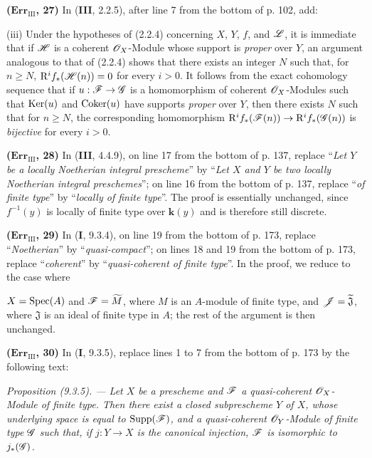 \noindent\textbf{($\mathbf{Err}_{\mathrm{III}}$, 27)} In (\textbf{III}, 2.2.5),
after line 7 from the bottom of p. 102, add:

(iii) Under the hypotheses of (2.2.4) concerning $X$, $Y$, $f$, and $\mathscr{L}$,
it is immediate that if $\mathscr{H}$ is a coherent $\mathscr{O}_X$-Module whose support
is \emph{proper} over $Y$, an argument analogous to that of (2.2.4) shows
that there exists an integer $N$ such that, for $n\geq N$,
$\mathrm{R}^if_*(\mathscr{H}(n))=0$ for every $i>0$. It follows from the exact
cohomology sequence that if $u:\mathscr{F}\to\mathscr{G}$ is a homomorphism of coherent
$\mathscr{O}_X$-Modules such that $\operatorname{Ker}(u)$ and $\operatorname{Coker}(u)$ have supports
\emph{proper} over $Y$, then there exists $N$ such that for $n\geq N$, the
corresponding homomorphism
$\mathrm{R}^if_*(\mathscr{F}(n))\to\mathrm{R}^if_*(\mathscr{G}(n))$ is \emph{bijective} for every
$i>0$.

\noindent\textbf{($\mathbf{Err}_{\mathrm{III}}$, 28)} In (\textbf{III}, 4.4.9), on
line 17 from the bottom of p. 137, replace ``\emph{Let $Y$ be a locally
Noetherian integral prescheme}'' by ``\emph{Let $X$ and $Y$ be two locally
Noetherian integral preschemes}''; on line 16 from the bottom of p. 137,
replace ``\emph{of finite type}'' by ``\emph{locally of finite type}''. The
proof is essentially unchanged, since $f^{-1}(y)$ is locally of finite type
over $\boldsymbol{k}(y)$ and is therefore still discrete.

\noindent\textbf{($\mathbf{Err}_{\mathrm{III}}$, 29)} In (\textbf{I}, 9.3.4), on line
19 from the bottom of p. 173, replace ``\emph{Noetherian}'' by
``\emph{quasi-compact}''; on lines 18 and 19 from the bottom of p. 173,
replace ``\emph{coherent}'' by ``\emph{quasi-coherent of finite type}''. In
the proof, we reduce to the case where

$X=\operatorname{Spec}(A)$ and $\mathscr{F}=\widetilde M$, where $M$ is an $A$-module of finite
type, and $\mathscr{J}=\widetilde{\mathfrak J}$, where $\mathfrak J$ is an ideal of
finite type in $A$; the rest of the argument is then unchanged.

\noindent\textbf{($\mathbf{Err}_{\mathrm{III}}$, 30)} In (\textbf{I}, 9.3.5),
replace lines 1 to 7 from the bottom of p. 173 by the following text:

\emph{Proposition (9.3.5). --- Let $X$ be a prescheme and $\mathscr{F}$ a
quasi-coherent $\mathscr{O}_X$-Module of finite type. Then there exist a closed
subprescheme $Y$ of $X$, whose underlying space is equal to
$\operatorname{Supp}(\mathscr{F})$, and a quasi-coherent $\mathscr{O}_Y$-Module of
finite type $\mathscr{G}$ such that, if $j:Y\to X$ is the canonical injection,
$\mathscr{F}$ is isomorphic to $j_*(\mathscr{G})$.}

